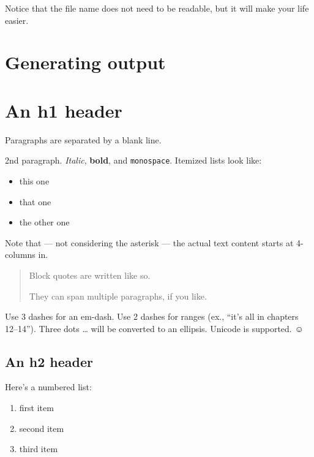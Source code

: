 \documentclass[11pt,twoside,makeidx,hidelinks,]{memoir}
\begin{document}
Notice that the file name does not need to be readable, but it will make your life easier.



\chapter{Generating output}\hypertarget{generating-output}{}\label{generating-output}



\chapter{An h1 header}\hypertarget{an-h1-header}{}\label{an-h1-header}

Paragraphs are separated by a blank line.

2nd paragraph. \emph{Italic}, \textbf{bold}, and \texttt{monospace}. Itemized lists
look like:

\begin{itemize}
\item{} this one
\item{} that one
\item{} the other one
\end{itemize}

Note that --- not considering the asterisk --- the actual text
content starts at 4-columns in.

\begin{quotation}
Block quotes are
written like so.

They can span multiple paragraphs,
if you like.
\end{quotation}

Use 3 dashes for an em-dash. Use 2 dashes for ranges (ex., ``it's all
in chapters 12--14''). Three dots \ldots{} will be converted to an ellipsis.
Unicode is supported. ☺

\section{An h2 header}\hypertarget{an-h2-header}{}\label{an-h2-header}

Here's a numbered list:

\begin{enumerate}
\item{} first item
\item{} second item
\item{} third item
\end{enumerate}
\end{document}
